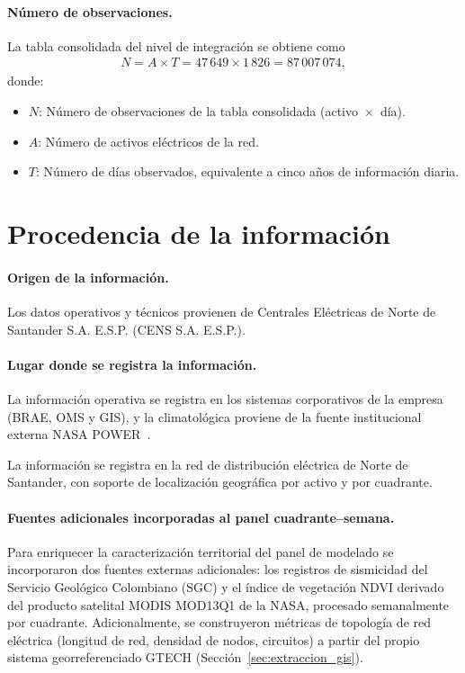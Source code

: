 \paragraph{Número de observaciones.}
La tabla consolidada del nivel de integración se obtiene como
\begin{equation}
    \begin{aligned}
    N = A \times T = 47\,649 \times 1\,826 = 87\,007\,074,
    \end{aligned}
    \label{eq:total_observaciones}
\end{equation}
donde:
\begin{itemize}
    \item $N$: Número de observaciones de la tabla consolidada (activo~$\times$~día).
    \item $A$: Número de activos eléctricos de la red.
    \item $T$: Número de días observados, equivalente a cinco años de información diaria.
\end{itemize}

\section{Procedencia de la información}

\paragraph{Origen de la información.}
Los datos operativos y técnicos provienen de Centrales Eléctricas de Norte de Santander S.A. E.S.P. (CENS S.A. E.S.P.).

\paragraph{Lugar donde se registra la información.}
La información operativa se registra en los sistemas corporativos de la empresa (BRAE, OMS y GIS), y la climatológica proviene de la fuente institucional externa NASA POWER~\cite{ref48}.

La información se registra en la red de distribución eléctrica de Norte de Santander, con soporte de localización geográfica por activo y por cuadrante.

\paragraph{Fuentes adicionales incorporadas al panel cuadrante--semana.}
Para enriquecer la caracterización territorial del panel de modelado se incorporaron dos fuentes externas adicionales: los registros de sismicidad del Servicio Geológico Colombiano (SGC) y el índice de vegetación NDVI derivado del producto satelital MODIS MOD13Q1 de la NASA, procesado semanalmente por cuadrante. Adicionalmente, se construyeron métricas de topología de red eléctrica (longitud de red, densidad de nodos, circuitos) a partir del propio sistema georreferenciado GTECH (Sección~\ref{sec:extraccion_gis}).


